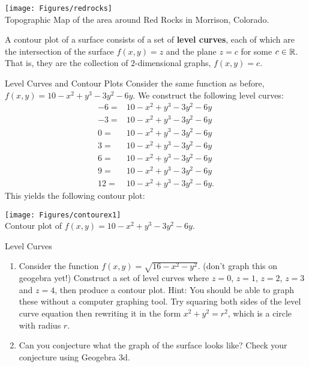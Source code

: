\begin{center}
\texttt{[image: Figures/redrocks]}\\
Topographic Map of the area around Red Rocks in Morrison, Colorado.
\end{center}

A contour plot of a surface consists of a set of \textbf{level curves}, each of which are the intersection of the surface $f(x,y)=z$ and the plane $z=c$ for some $c\in\mathbb{R}$. That is, they are the collection of $2$-dimensional graphs, $f(x,y)=c$.

\begin{example}{Level Curves and Contour Plots}
Consider the same function as before, $f(x,y)=10-x^2+y^3-3y^2-6y$. We construct the following level curves:
\begin{align*}
-6=&10-x^2+y^3-3y^2-6y\\
-3=&10-x^2+y^3-3y^2-6y\\
0=&10-x^2+y^3-3y^2-6y\\
3=&10-x^2+y^3-3y^2-6y\\
6=&10-x^2+y^3-3y^2-6y\\
9=&10-x^2+y^3-3y^2-6y\\
12=&10-x^2+y^3-3y^2-6y.
\end{align*}
This yields the following contour plot:
\vspace{1em}
\begin{center}
\texttt{[image: Figures/contourex1]}\\
Contour plot of $f(x,y)=10-x^2+y^3-3y^2-6y$.
\end{center}
\end{example}

\begin{exercise}{Level Curves}
\begin{enumerate}
\item Consider the function $f(x,y)=\sqrt{16-x^2-y^2}$. (don't graph this on geogebra yet!) Construct a set of level curves where $z=0$, $z=1$, $z=2$, $z=3$ and $z=4$, then produce a contour plot. Hint: You should be able to graph these without a computer graphing tool. Try squaring both sides of the level curve equation then rewriting it in the form $x^2+y^2=r^2$, which is a circle with radius $r$. 
\vspace{1em}
\item Can you conjecture what the graph of the surface looks like? Check your conjecture using Geogebra 3d.
\end{enumerate}
\end{exercise}
